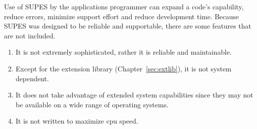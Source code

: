 Use of SUPES by the applications programmer can expand a code's capability,
reduce errors, minimize support effort and reduce development time.  Because
SUPES was designed to be reliable and supportable, there are some features
that are not included.
\begin{enumerate}

\item It is not extremely sophisticated, rather it is
reliable and maintainable.

\item Except for the extension library (Chapter~\ref{sec:extlib}), it is not system dependent.

\item It does not take advantage of extended
system capabilities since they may not be available on a wide range of
operating systems.

\item It is not written to maximize cpu speed.

\end{enumerate}
